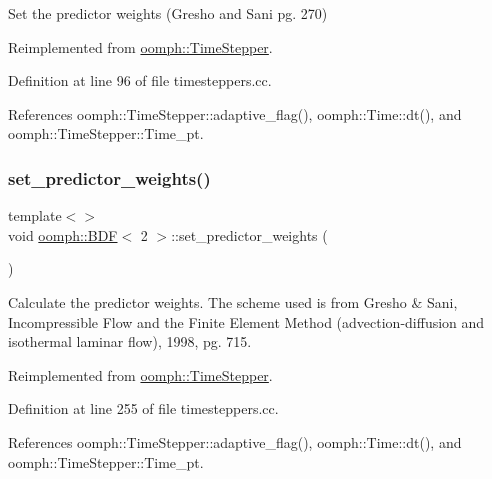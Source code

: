 Set the predictor weights (Gresho and Sani pg. 270) 



Reimplemented from \hyperlink{classoomph_1_1TimeStepper_a2dfb949155ba433066fd69dc427ba1ce}{oomph\+::\+Time\+Stepper}.



Definition at line 96 of file timesteppers.\+cc.



References oomph\+::\+Time\+Stepper\+::adaptive\+\_\+flag(), oomph\+::\+Time\+::dt(), and oomph\+::\+Time\+Stepper\+::\+Time\+\_\+pt.

\mbox{\label{classoomph_1_1BDF_a77a34b38a52120ed7eb9fec88bfdc3ca}} 
\subsubsection{\texorpdfstring{set\+\_\+predictor\+\_\+weights()}{set\_predictor\_weights()}\hspace{0.1cm}{\footnotesize\ttfamily [2/4]}}
{\footnotesize\ttfamily template$<$$>$ \\
void \hyperlink{classoomph_1_1BDF}{oomph\+::\+B\+DF}$<$ 2 $>$\+::set\+\_\+predictor\+\_\+weights (\begin{DoxyParamCaption}{ }\end{DoxyParamCaption})\hspace{0.3cm}{\ttfamily [virtual]}}

Calculate the predictor weights. The scheme used is from Gresho \& Sani, Incompressible Flow and the Finite Element Method (advection-\/diffusion and isothermal laminar flow), 1998, pg. 715. 

Reimplemented from \hyperlink{classoomph_1_1TimeStepper_a2dfb949155ba433066fd69dc427ba1ce}{oomph\+::\+Time\+Stepper}.



Definition at line 255 of file timesteppers.\+cc.



References oomph\+::\+Time\+Stepper\+::adaptive\+\_\+flag(), oomph\+::\+Time\+::dt(), and oomph\+::\+Time\+Stepper\+::\+Time\+\_\+pt.

\mbox{\label{classoomph_1_1BDF_a7a436823d855b4148a2a9f5a63ed8f3d}} 
